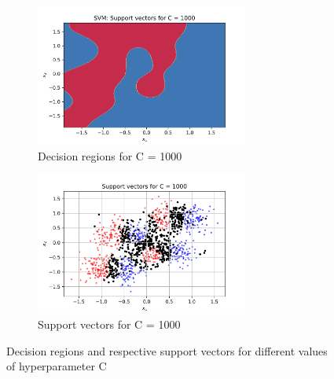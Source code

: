 \documentclass[a4paper]{article}    %
\begin{document}
\begin{figure}[H]
\begin{subfigure}{0.45\textwidth}
        \centering
        \includegraphics[width=7cm]{decision_region_C_1000}
        \caption{Decision regions for C = 1000}
        \label{fig:svm-decision_region_C_1000}
    \end{subfigure}
    \hfill
    \begin{subfigure}{0.45\textwidth}
        \centering
        \includegraphics[width=7cm]{support_vectors_C_1000}
        \caption{Support vectors for C = 1000}
        \label{fig:svm-support_vectors_C_1000}
    \end{subfigure}
    \caption{Decision regions and respective support vectors for different values of hyperparameter C}
    \label{fig:svm-decision_regions_support_vectos_C}
\end{figure}




\end{document}
